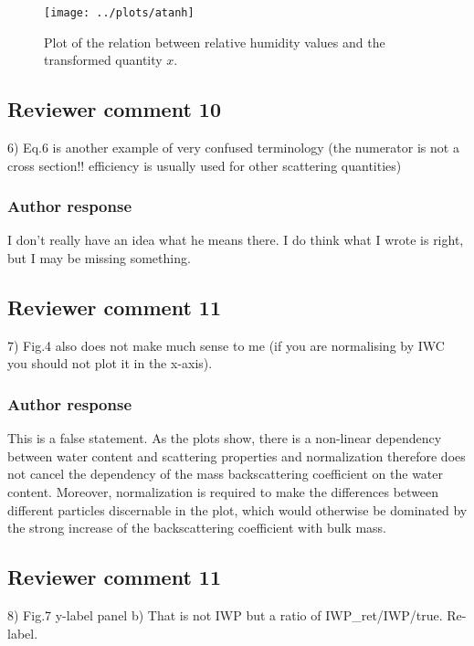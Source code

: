 \begin{description}
\begin{figure}
 \texttt{[image: ../plots/atanh]}
 \caption{Plot of the relation between relative humidity values and the
   transformed quantity $x$.}
 \label{fig:atanh}
\end{figure}

\subsection*{Reviewer comment 10}


6) Eq.6 is another example of very confused terminology (the numerator is not a
cross section!! efficiency is usually used for other scattering quantities)

\subsubsection*{Author response}

I don't really have an idea what he means there. I do think what I wrote
is right, but I may be missing something.


\subsection*{Reviewer comment 11}

7) Fig.4 also does not make much sense to me (if you are normalising by IWC you
should not plot it in the x-axis).

\subsubsection{Author response}

This is a false statement. As the plots show, there is a non-linear dependency
between water content and scattering properties and normalization therefore does
not cancel the dependency of the mass backscattering coefficient on the water
content. Moreover, normalization is required to make the differences between
different particles discernable in the plot, which would otherwise be dominated
by the strong increase of the backscattering coefficient with bulk mass.

\subsection*{Reviewer comment 11}

8) Fig.7 y-label panel b) That is not IWP but a ratio of IWP_ret/IWP/true. Re-label.


\end{description}

